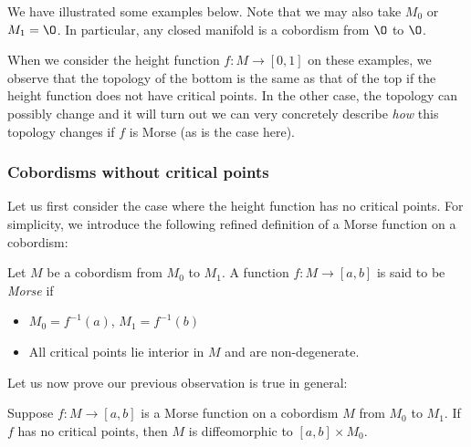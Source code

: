 We have illustrated some examples below.
Note that we may also take $M_0$ or $M_1 = \O$.
In particular, any closed manifold is a cobordism from $\O$ to $\O$.
\begin{figure}[H]
    \centering
\end{figure}

When we consider the height function $f: M \to  [0, 1]$ on these examples,
we observe that the topology of the bottom is the same as that of the top if the height function does not have critical points.
In the other case, the topology can possibly change and it will turn out we can very concretely describe \emph{how} this topology changes if $f$ is Morse (as is the case here).

\subsubsection*{Cobordisms without critical points}
Let us first consider the case where the height function has no critical points.
For simplicity, we introduce the following refined definition of a Morse function on a cobordism:
\begin{definition}
    Let $M$ be a cobordism from $M_0$ to $M_1$.
    A function $f: M \to  [a, b]$ is said to be \emph{Morse} if 
    \begin{itemize}
        \item $M_0 = f^{-1}(a)$, $M_1 = f^{-1}(b)$
        \item All critical points lie interior in $M$ and are non-degenerate.
    \end{itemize}
\end{definition}

Let us now prove our previous observation is true in general:
\begin{prop}
    Suppose $f: M \to  [a, b]$ is a Morse function on a cobordism $M$ from  $ M_0$ to $ M_1$.
    If $f$ has no critical points, then $M$ is diffeomorphic to $[a, b] \times  M_0$.
\end{prop}

